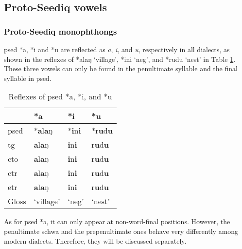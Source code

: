 \subsection{Proto-Seediq vowels} \label{sec:psedV}

\subsubsection{Proto-Seediq monophthongs} \label{sec:psedV_mono}

\acl{psed} *a, *i and *u are reflected as \textit{a}, \textit{i}, and \textit{u}, respectively in all dialects, as shown in the reflexes of *alaŋ `village', *ini `\acs{neg}', and *rudu `nest' in Table \ref{tab:psed_aiu}. These three vowels can only be found in the penultimate syllable and the final syllable in \acl{psed}.  

\begin{table}[!htbp]
\centering
\caption{Reflexes of \acl{psed} *a, *i, and *u}
\label{tab:psed_aiu}
\begin{tabular}{llll}
\hline
           & *a        & *i          & *u     \\ \hline
\acs{psed} & *\textbf{a}l\textbf{a}ŋ     & *\textbf{i}n\textbf{i}        & *r\textbf{u}d\textbf{u}  \\ \hdashline
\acs{tg}   & \textbf{a}l\textbf{a}ŋ      & \textbf{i}n\textbf{i}         & r\textbf{u}d\textbf{u}   \\
\acs{cto}  & \textbf{a}l\textbf{a}ŋ      & \textbf{i}n\textbf{i}         & r\textbf{u}d\textbf{u}   \\
\acs{ctr}  & \textbf{a}l\textbf{a}ŋ      & \textbf{i}n\textbf{i}         & r\textbf{u}d\textbf{u}   \\
\acs{etr}  & \textbf{a}l\textbf{a}ŋ      & \textbf{i}n\textbf{i}         & r\textbf{u}d\textbf{u}   \\ \hline
Gloss      & `village' & `\acs{neg}' & `nest' \\ \hline
\end{tabular}
\end{table}

As for \acl{psed} *ə, it can only appear at non-word-final positions. However, the penultimate schwa and the prepenultimate ones behave very differently among modern dialects. Therefore, they will be discussed separately. 

